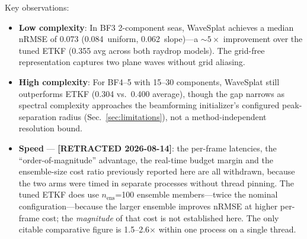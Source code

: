 Key observations:
\begin{itemize}
  \item \textbf{Low complexity}: In BF3 2-component seas,
    WaveSplat achieves a median nRMSE of 0.073 (0.084~uniform,
    0.062~slope)---a ${\sim}5\times$ improvement over the tuned
    ETKF (0.355 avg across both raydrop models). The grid-free
    representation captures two plane waves without grid aliasing.
  \item \textbf{High complexity}: For BF4--5 with 15--30 components,
    WaveSplat still outperforms ETKF (0.304 vs.\ 0.400 average),
    though the gap narrows as spectral complexity approaches the
    beamforming initializer's configured peak-separation radius
    (Sec.~\ref{sec:limitations}), not a method-independent resolution
    bound.
  \item \textbf{Speed} --- \textbf{[RETRACTED 2026-08-14]}: the per-frame
    latencies, the ``order-of-magnitude'' advantage, the real-time budget
    margin and the ensemble-size cost ratio previously reported here are all
    withdrawn, because the two arms were timed in separate processes without
    thread pinning. The tuned ETKF does use $n_{\text{ens}}$=100 ensemble
    members---twice the nominal configuration---because the larger ensemble
    improves nRMSE at higher per-frame cost; the \emph{magnitude} of that
    cost is not established here. The only citable comparative figure is
    1.5--2.6$\times$ within one process on a single thread.
\end{itemize}

